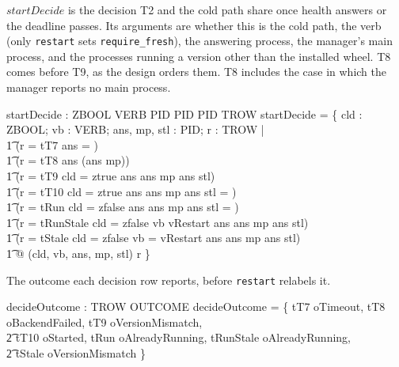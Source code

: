 \documentclass[a4paper,10pt,fleqn]{article}
\begin{document}
$startDecide$ is the decision T2 and the cold path share once health answers
or the deadline passes. Its arguments are whether this is the cold path, the
verb (only \texttt{restart} sets \texttt{require\_fresh}), the answering
process, the manager's main process, and the processes running a version
other than the installed wheel. T8 comes before T9, as the design orders
them. T8 includes the case in which the manager reports no main process.

\begin{axdef}
  startDecide : ZBOOL \cross VERB \cross \power PID \cross \power PID
    \cross \power PID \rel TROW
\where
  startDecide = \{ cld : ZBOOL; vb : VERB; ans, mp, stl : \power PID;
      r : TROW | \\
  \t1 (r = tT7 \land ans = \emptyset) \lor \\
  \t1 (r = tT8 \land ans \neq \emptyset \land \lnot (ans \subseteq mp)) \lor \\
  \t1 (r = tT9 \land cld = ztrue \land ans \neq \emptyset \land
      ans \subseteq mp \land ans \subseteq stl) \lor \\
  \t1 (r = tT10 \land cld = ztrue \land ans \neq \emptyset \land
      ans \subseteq mp \land ans \cap stl = \emptyset) \lor \\
  \t1 (r = tRun \land cld = zfalse \land ans \neq \emptyset \land
      ans \subseteq mp \land ans \cap stl = \emptyset) \lor \\
  \t1 (r = tRunStale \land cld = zfalse \land vb \neq vRestart \land
      ans \neq \emptyset \land ans \subseteq mp \land ans \subseteq stl) \lor \\
  \t1 (r = tStale \land cld = zfalse \land vb = vRestart \land
      ans \neq \emptyset \land ans \subseteq mp \land ans \subseteq stl) \\
  \t1 @ (cld, vb, ans, mp, stl) \mapsto r \}
\end{axdef}

The outcome each decision row reports, before \texttt{restart} relabels it.

\begin{axdef}
  decideOutcome : TROW \pfun OUTCOME
\where
  decideOutcome = \{ tT7 \mapsto oTimeout, tT8 \mapsto oBackendFailed,
      tT9 \mapsto oVersionMismatch, \\
  \t2 tT10 \mapsto oStarted, tRun \mapsto oAlreadyRunning,
      tRunStale \mapsto oAlreadyRunning, \\
  \t2 tStale \mapsto oVersionMismatch \}
\end{axdef}
\end{document}
